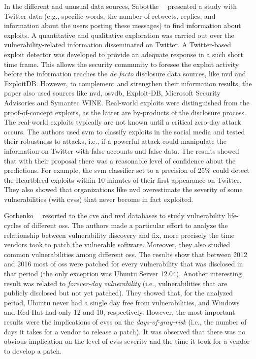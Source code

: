 In the different and unusual data sources, Sabottke~\etal{}~\cite{Sabottke:2015} presented a study with Twitter data (e.g., specific words, the number of retweets, replies, and information about the users posting these messages) to find information about exploits. 
A quantitative and qualitative exploration was carried out over the vulnerability-related information disseminated on Twitter.
A Twitter-based exploit detector was developed to provide an adequate response in a such short time frame. 
This allows the security community to foresee the exploit activity before the information reaches the \emph{de facto} disclosure data sources, like \gls{nvd} and ExploitDB.
However, to complement and strengthen their information results, the paper also used sources like \gls{nvd}, \gls{osvdb}, Exploit-DB, Microsoft Security Advisories and Symantec WINE. 
Real-world exploits were distinguished from the proof-of-concept exploits, as the latter are by-products of the disclosure process. 
The real-world exploits typically are not known until a critical zero-day attack occurs. 
The authors used \gls{svm} to classify exploits in the social media and tested their robustness to attacks, i.e., if a powerful attack could manipulate the information on Twitter with false accounts and false data. 
The results showed that with their proposal there was a reasonable level of confidence about the predictions. 
For example, the \gls{svm} classifier set to a precision of 25\% could detect the Heartbleed exploits within 10 minutes of their first appearance on Twitter. 
They also showed that organizations like \gls{nvd} overestimate the severity of some vulnerabilities (with \gls{cvss}) that never become in fact exploited.


Gorbenko~\etal{}~\cite{Gorbenko:2017} resorted to the \gls{cve} and \gls{nvd} databases to study vulnerability life-cycles of different \glspl{os}.
The authors made a particular effort to analyze the relationship between vulnerability discovery and fix, more precisely the time vendors took to patch the vulnerable software.
Moreover, they also studied common vulnerabilities among different \glspl{os}.
The results show that between 2012 and 2016 most of \glspl{os} were patched for every vulnerability that was disclosed in that period (the only exception was Ubuntu Server 12.04).
Another interesting result was related to \emph{forever-day vulnerability} (i.e., vulnerabilities that are publicly disclosed but not yet patched). 
They showed that, for the analyzed period, Ubuntu never had a single day free from vulnerabilities, and Windows and Red Hat had only 12 and 10, respectively.
However, the most important results were the implications of \gls{cvss} on the \emph{days-of-gray-risk} (i.e., the number of days it takes for a vendor to release a patch). 
It was observed that there was no obvious implication on the level of \gls{cvss} severity and the time it took for a vendor to develop a patch.


